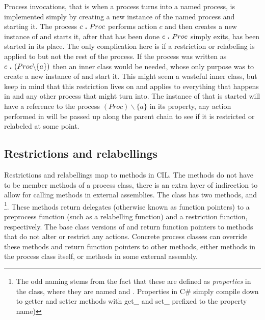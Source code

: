 	Process invocations, that is when a process turns into a named process, is 
	implemented simply by creating a new instance of the named process and 
	starting it. The process $c \ \textbf{.}\  Proc$ performs action $c$ and then 
	creates a new instance of  and starts it, after that has been 
	done $c \ \textbf{.}\  Proc$ simply exits,  has been started in its 
	place. The only complication here is if a restriction or relabeling is 
	applied to  but not the rest of the process. If the process was 
	written as $c \ \textbf{.}\  (Proc \backslash\{a\})$ then an inner class would be 
	needed, whose only purpose was to create a new instance of  and 
	start it. This might seem a wasteful inner class, but keep in mind that this 
	restriction lives on and applies to everything that happens in  
	and any other process that  might turn into. The instance of 
	 that is started will have a reference to the process $(Proc 
	)\backslash\{a\}$ in its  property, any action performed in 
	 will be passed up along the parent chain to see if it is 
	restricted or relabeled at some point.
	
	\subsection{Restrictions and relabellings}
	Restrictions and relabellings map to methods in CIL. The methods do not
	have to be member methods of a process class, there is an extra layer
	of indirection to allow for calling methods in external assemblies. The
	 class has two methods,  and 
	 \footnote{The odd naming stems from the fact that these 
	are defined as \textit{properties} in the  class, where 
	they are named  and . Properties in C\# 
	simply compile down to getter and setter methods with get\_ and set\_ 
	prefixed to the property name)}. These methods return delegates (otherwise 
	known as function pointers) to a preprocess function (such as a relabelling 
	function) and a restriction function, respectively. The base class versions 
	of  and  return function pointers 
	to methods that do not alter or restrict any actions. Concrete process 
	classes can override these methods and return function pointers to other 
	methods, either methods in the process class itself, or methods in some 
	external assembly. 
	
